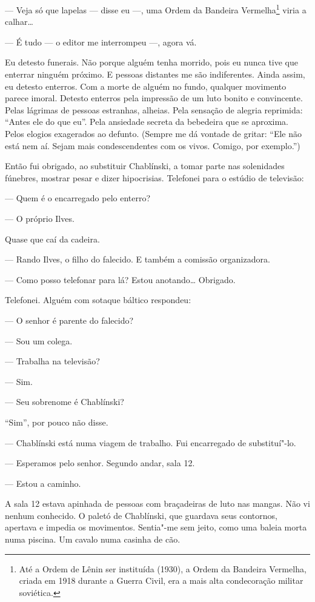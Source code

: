 --- Veja só que lapelas --- disse eu ---, uma Ordem da Bandeira
Vermelha\footnote{Até a Ordem de Lênin ser instituída (1930), a Ordem da
  Bandeira Vermelha, criada em 1918 durante a Guerra Civil, era a mais
  alta condecoração militar soviética.} viria a calhar\ldots{}

--- É tudo --- o editor me interrompeu ---, agora vá.

Eu detesto funerais. Não porque alguém tenha morrido, pois eu nunca tive
que enterrar ninguém próximo. E pessoas distantes me são indiferentes.
Ainda assim, eu detesto enterros. Com a morte de alguém no fundo,
qualquer movimento parece imoral. Detesto enterros pela impressão de um
luto bonito e convincente. Pelas lágrimas de pessoas estranhas, alheias.
Pela sensação de alegria reprimida: ``Antes ele do que eu''. Pela
ansiedade secreta da bebedeira que se aproxima. Pelos elogios exagerados
ao defunto. (Sempre me dá vontade de gritar: ``Ele não está nem aí.
Sejam mais condescendentes com os vivos. Comigo, por exemplo.'')

Então fui obrigado, ao substituir Chablínski, a tomar parte nas
solenidades fúnebres, mostrar pesar e dizer hipocrisias. Telefonei para
o estúdio de televisão:

--- Quem é o encarregado pelo enterro?

--- O próprio Ilves.

Quase que caí da cadeira.

--- Rando Ilves, o filho do falecido. E também a comissão organizadora.

--- Como posso telefonar para lá? Estou anotando\ldots{} Obrigado.

Telefonei. Alguém com sotaque báltico respondeu:

--- O senhor é parente do falecido?

--- Sou um colega.

--- Trabalha na televisão?

--- Sim.

--- Seu sobrenome é Chablínski?

``Sim'', por pouco não disse.

--- Chablínski está numa viagem de trabalho. Fui encarregado de
substituí"-lo.

--- Esperamos pelo senhor. Segundo andar, sala 12.

--- Estou a caminho.

A sala 12 estava apinhada de pessoas com braçadeiras de luto nas mangas.
Não vi nenhum conhecido. O paletó de Chablínski, que guardava seus
contornos, apertava e impedia os movimentos. Sentia"-me sem jeito, como
uma baleia morta numa piscina. Um cavalo numa casinha de cão.

